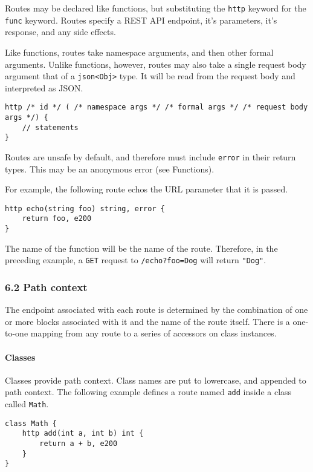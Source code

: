Routes may be declared like functions, but substituting the
\texttt{http} keyword for the \texttt{func} keyword. Routes specify a
REST API endpoint, it's parameters, it's response, and any side effects.

Like functions, routes take namespace arguments, and then other formal
arguments. Unlike functions, however, routes may also take a single
request body argument that of a
\texttt{json\textless{}Obj\textgreater{}} type. It will be read from the
request body and interpreted as JSON.

\begin{verbatim}
http /* id */ ( /* namespace args */ /* formal args */ /* request body args */) {
    // statements
}
\end{verbatim}

Routes are unsafe by default, and therefore must include \texttt{error}
in their return types. This may be an anonymous error (see Functions).

For example, the following route echos the URL parameter that it is
passed.

\begin{verbatim}
http echo(string foo) string, error {
    return foo, e200
}
\end{verbatim}

The name of the function will be the name of the route. Therefore, in
the preceding example, a \texttt{GET} request to \texttt{/echo?foo=Dog}
will return \texttt{"Dog"}.

\subsubsection*{6.2 Path context}\label{path-context}

The endpoint associated with each route is determined by the combination
of one or more blocks associated with it and the name of the route
itself. There is a one-to-one mapping from any route to a series of
accessors on class instances.

\paragraph{Classes}\label{classes-1}

Classes provide path context. Class names are put to lowercase, and
appended to path context. The following example defines a route named
\texttt{add} inside a class called \texttt{Math}.

\begin{verbatim}
class Math {
    http add(int a, int b) int {
        return a + b, e200
    }
}
\end{verbatim}

